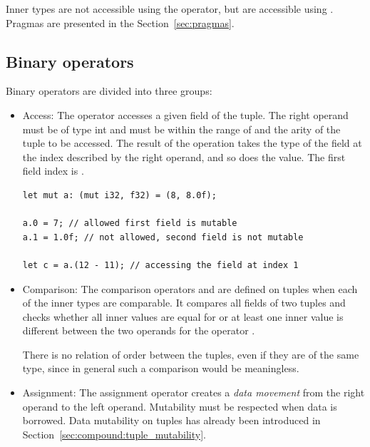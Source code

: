 \smallskip

Inner types are not accessible using the \token{::} operator, but are
accessible using . Pragmas are presented in the
Section~\ref{sec:pragmas}.

\subsection{Binary operators}

Binary operators are divided into three groups:
\begin{itemize}
  \setlength\itemsep{-4pt}
\item Access: The operator  accesses a given field of the
  tuple. The right operand must be of type int and must be within the range of
   and the arity of the tuple to be accessed. The result of the
  operation takes the type of the field at the index described by the right
  operand, and so does the value. The first field index is .

  \begin{lstlisting}[style=coloredverbatimError, linewidth=0.95\linewidth]
let mut a: (mut i32, f32) = (8, 8.0f);

a.0 = 7; // allowed first field is mutable
a.1 = 1.0f; // not allowed, second field is not mutable

let c = a.(12 - 11); // accessing the field at index 1
  \end{lstlisting}

\item Comparison: The comparison operators \token{==} and \token{!=} are
  defined on tuples when each of the inner types are comparable. It compares all
  fields of two tuples and checks whether all inner values are equal for
  \token{==} or at least one inner value is different between the two operands
  for the operator \token{!=}.

  There is no relation of order between the tuples, even if they are of the same
  type, since in general such a comparison would be meaningless.

\item Assignment: The assignment operator creates a \textit{data movement}
  from the right operand to the left operand. Mutability must be respected when
  data is borrowed. Data mutability on tuples has already been introduced in
  Section~\ref{sec:compound:tuple_mutability}.

\end{itemize}


